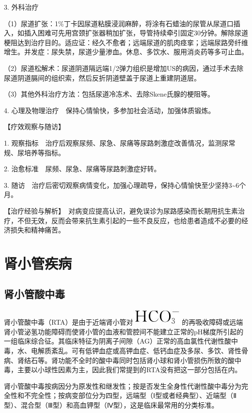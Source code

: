 3. 外科治疗

（1）尿道扩张：1\%丁卡因尿道粘膜浸润麻醉，将涂有石蜡油的尿管从尿道口插入，如插入困难可先用宫颈扩张器稍加扩张，导管持续牵引固定30分钟。解除尿道梗阻达到治疗目的。适应证：经久不愈者；远端尿道的肌肉痉挛；远端尿路旁纤维增生。并发症：尿失禁，尿道少量渗血。休息、多饮水、服用消炎药等多可止血。

（2）尿道松解术：尿道阴道隔远端1/2弹力组织是增加US的病因，通过手术去除尿道阴道膈间的组织索，然后反折阴道壁盖于尿道上重建阴道层。

（3）其他外科治疗方法：包括尿道冷冻术、去除Skene氏腺的梗阻等。

4. 心理及物理治疗　保持心情愉快，多参加社会活动，加强体质锻炼。

【疗效观察与随访】

1.
观察指标　治疗后观察尿频、尿急、尿痛等尿路刺激症改善情况，监测尿常规、尿培养等指标。

2. 治愈标准　尿频、尿急、尿痛等尿路刺激症好转。

3.
随访　治疗后密切观察病情变化，加强心理疏导，保持心情愉快至少坚持3\textasciitilde{}6个月。

【治疗经验与解析】　对病变应提高认识，避免误诊为尿路感染而长期用抗生素治疗，不但无效，反而会带来抗生素引起的一些不良反应，也给患者造成不必要的经济损失和精神痛苦。

\section{肾小管疾病}

\subsection{肾小管酸中毒}

肾小管酸中毒（RTA）是由于近端肾小管对\includegraphics{./images/Image00128.jpg}
的再吸收障碍或远端肾小管泌氢功能障碍而使肾小管的血液和管腔间不能建立正常的pH梯度所引起的一组临床综合征。其临床特征为阴离子间隙（AG）正常的高血氯性代谢性酸中毒，水、电解质紊乱。可有低钾血症或高钾血症、低钙血症及多尿、多饮、肾性骨病、肾结石等。肾功能不全时的酸中毒同时包括肾小球和肾小管损伤所致的酸中毒，主要以小球性因素为主，因此我们常提到的RTA没有把这一部分包括在内。

肾小管酸中毒按病因分为原发性和继发性；按是否发生全身性代谢性酸中毒分为完全性和不完全性；按病变部位分为四型，远端型（Ⅰ型或者经典型）、近端型（Ⅱ型）、混合型（Ⅲ型）和高血钾型（Ⅳ型），这是临床最常用的分类标准。

